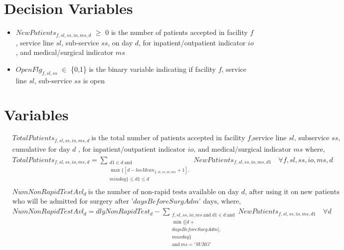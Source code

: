 \documentclass[10pt, letterpaper]{article}
\begin{document}
\section*{Decision Variables}
\begin{itemize}
\item [ ] $NewPatients_{f,sl,ss,io,ms,d}$ $\geq$ {0} is the number of patients accepted in facility $f$, service line $sl$, sub-service $ss$, on day $d$, for inpatient/outpatient indicator $io$, and medical/surgical indicator $ms$
\item [ ] $OpenFlg_{f,sl,ss}$ $\in$ \{0,1\} is the binary variable indicating if facility $f$, service line $sl$, sub-service $ss$ is open
\end{itemize}

\section*{Variables}
\begin{align*}
&TotalPatients_{f,sl,ss,io,ms,d} \ \text{is the total number of patients accepted in facility $f$,service line $sl$, subservice $ss$,} \\
&\text{cumulative for day $d$ , for inpatient/outpatient indicator $io$, and medical/surgical indicator $ms$ where,} \\
&TotalPatients_{f,sl,ss,io,ms,d} =
\sum_{\substack{d1 \in d \ \text{and} \\
\max \{[d - losMean_{f,sl,ss,io,ms} + 1], \\ minday \} \leq d1 \leq d}}  NewPatients_{f,sl,ss,io,ms,d1} \quad \forall f,sl,ss,io,ms,d\ \\
\end{align*}
\begin{align*}
&NumNonRapidTestAvl_{d} \ \text{is the number of non-rapid tests available on day $d$, after using it  on new patients} \\
&\text{who will be admitted for surgery after '$daysBeforeSurgAdm$' days, where,} \\
& NumNonRapidTestAvl_{d} = dlyNonRapidTest_{d} - 
\sum_{\substack{f,sl,ss,io,ms \ \text{and} \ d1 \in d \ \text{and} \\
\min \{[d+ \\ daysBeforeSurgAdm], \\ maxday \} \\
\text{and} \ ms = 'SURG'}}  NewPatients_{f,sl,ss,io,ms,d1} \quad \forall d\ \\
\end{align*}
\end{document}
